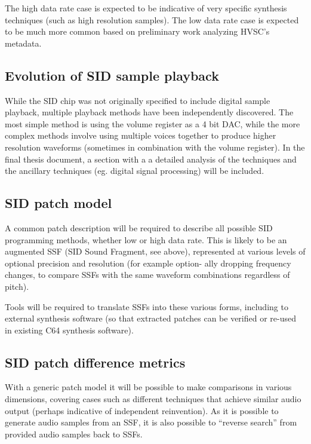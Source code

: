 \documentclass[10pt]{article}
\begin{document}
\begin{multicols*}{2}
The high data rate case is expected to be indicative of very specific synthesis techniques (such as high resolution samples). The low data rate case is expected to be much more common based on preliminary work analyzing HVSC’s metadata.

\subsection{Evolution of SID sample playback}

While the SID chip was not originally specified to include digital sample playback, multiple playback methods have been independently discovered. The most simple method is using the volume register as a 4 bit DAC, while the more complex methods involve using multiple voices together to produce higher resolution waveforms (sometimes in combination with the volume register). In the final thesis document, a section with a a detailed analysis of the techniques and the ancillary techniques (eg. digital signal processing) will be included.

\subsection{SID patch model}

A common patch description will be required to describe all possible SID programming methods, whether low or high data rate. This is likely to be an augmented SSF (SID Sound Fragment, see above), represented at various levels of optional precision and resolution (for example option- ally dropping frequency changes, to compare SSFs with the same waveform combinations regardless of pitch).

Tools will be required to translate SSFs into these various forms, including to external synthesis software (so that extracted patches can be verified or re-used in existing C64 synthesis software).

\subsection{SID patch difference metrics}

With a generic patch model it will be possible to make comparisons in various dimensions, covering cases such as different techniques that achieve similar audio output (perhaps indicative of independent reinvention). As it is possible to generate audio samples from an SSF, it is also possible to “reverse search” from provided audio samples back to SSFs.


\end{multicols*}
\end{document}
